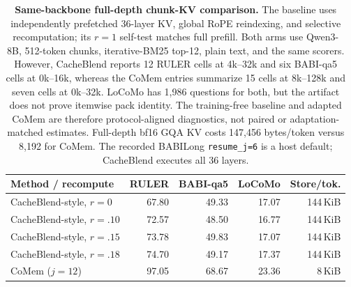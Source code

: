 \begin{table}[!htbp]
\centering
\small
\setlength{\tabcolsep}{3.2pt}
\begin{tabular}{@{}lrrrr@{}}
\toprule
\textbf{Method / recompute} & \textbf{RULER} & \textbf{BABI-qa5} &
\textbf{LoCoMo} & \textbf{Store/tok.} \\
\midrule
CacheBlend-style, $r{=}0$    & 67.80 & 49.33 & 17.07 & 144\,KiB \\
CacheBlend-style, $r{=}.10$  & 72.57 & 48.50 & 16.77 & 144\,KiB \\
CacheBlend-style, $r{=}.15$  & 73.78 & 49.83 & 17.07 & 144\,KiB \\
CacheBlend-style, $r{=}.18$  & 74.70 & 49.17 & 17.37 & 144\,KiB \\
\midrule
CoMem ($j{=}12$) & 97.05 & 68.67 & 23.36 & 8\,KiB \\
\bottomrule
\end{tabular}
\caption{\textbf{Same-backbone full-depth chunk-KV comparison.}
The baseline uses independently prefetched 36-layer KV, global RoPE reindexing,
and selective recomputation; its $r{=}1$ self-test matches full prefill. Both
arms use Qwen3-8B, 512-token chunks, iterative-BM25 top-12, plain text, and the
same scorers. However, CacheBlend reports 12 RULER cells at 4k--32k and six
BABI-qa5 cells at 0k--16k, whereas the CoMem entries summarize 15 cells at
8k--128k and seven cells at 0k--32k. LoCoMo has 1,986 questions for both, but
the artifact does not prove itemwise pack identity. The training-free baseline
and adapted CoMem are therefore protocol-aligned diagnostics, not paired or
adaptation-matched estimates. Full-depth bf16 GQA KV costs 147,456 bytes/token
versus 8,192 for CoMem. The recorded BABILong \texttt{resume\_j=6} is a host
default; CacheBlend executes all 36 layers.}
\label{tab:cacheblend-baseline}
\end{table}
